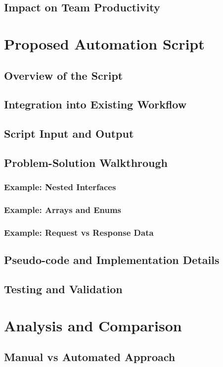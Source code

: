 \documentclass[12pt,a4paper]{article}
\begin{document}
  \subsection{Impact on Team Productivity}

\section{Proposed Automation Script} %
  \subsection{Overview of the Script}
  \subsection{Integration into Existing Workflow}
  \subsection{Script Input and Output}
  \subsection{Problem-Solution Walkthrough}
    \subsubsection{Example: Nested Interfaces}
    \subsubsection{Example: Arrays and Enums}
    \subsubsection{Example: Request vs Response Data}
  \subsection{Pseudo-code and Implementation Details}
  \subsection{Testing and Validation}

\section{Analysis and Comparison} %
  \subsection{Manual vs Automated Approach}
\end{document}
